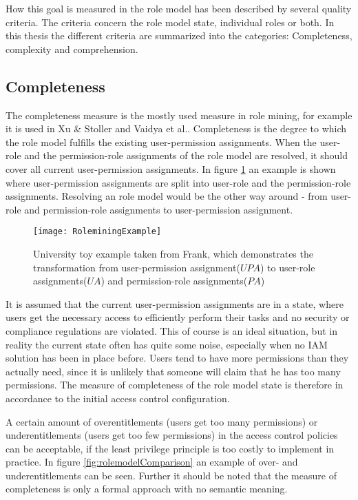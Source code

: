     How this goal is measured in the role model has been described by several quality criteria\cite{Kunz}\cite{Frank}. The criteria concern the role model state, individual roles or both. In this thesis the different criteria are summarized into the categories: Completeness, complexity and comprehension.
    
        \subsection{Completeness}
        \label{sec:completeness}
        The completeness measure is the mostly used measure in role mining\cite{Kunz}, for example it is used in Xu \& Stoller\cite{Xu} and Vaidya et al.\cite{Vaidya:2007}. Completeness is the degree to which the role model fulfills the existing user-permission assignments. When the user-role and the permission-role assignments of the role model are resolved, it should cover all current user-permission assignments. In figure \ref{fig:roleminingExample} an example is shown where user-permission assignments are split into user-role and the permission-role assignments. Resolving an role model would be the other way around - from user-role and permission-role assignments to user-permission assignment.
        
        \begin{figure}[H]
            \centering
            \texttt{[image: RoleminingExample]}
            \caption{University toy example taken from Frank\cite{roleMiningExample}, which demonstrates the transformation from user-permission assignment($UPA$) to user-role assignments($UA$) and permission-role assignments($PA$)}
            \label{fig:roleminingExample}
        \end{figure}
        
        It is assumed that the current user-permission assignments are in a state, where users get the necessary access to efficiently perform their tasks and no security or compliance regulations are violated. This of course is an ideal situation, but in reality the current state often has quite some noise, especially when no IAM solution has been in place before. Users tend to have more permissions than they actually need, since it is unlikely that someone will claim that he has too many permissions. The measure of completeness of the role model state is therefore in accordance to the initial access control configuration.
        
        A certain amount of overentitlements (users get too many permissions) or underentitlements (users get too few permissions) in the access control policies can be acceptable, if the least privilege principle is too costly to implement in practice. In figure \ref{fig:rolemodelComparison} an example of over- and underentitlements can be seen. Further it should be noted that the measure of completeness is only a formal approach with no semantic meaning.
        
